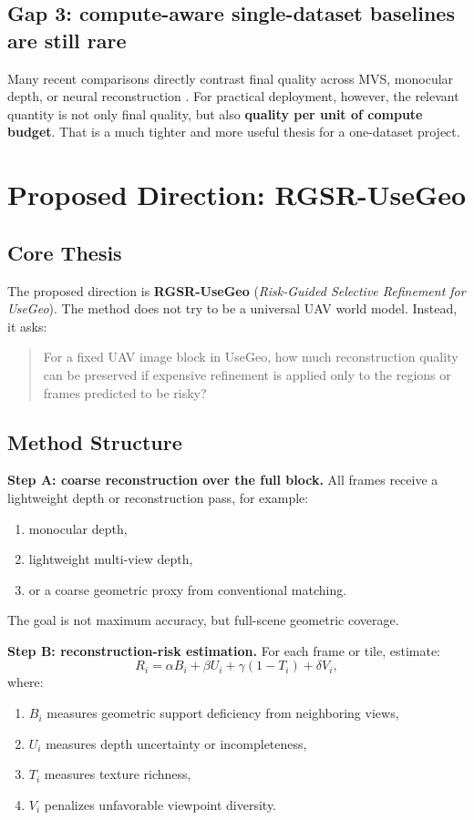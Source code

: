 \documentclass[11pt,a4paper]{article}
\begin{document}
\subsection{Gap 3: compute-aware single-dataset baselines are still rare}

Many recent comparisons directly contrast final quality across MVS, monocular depth, or neural reconstruction \citep{Wei2024LiDeNeRF,Wu2025AerialBlocks}. For practical deployment, however, the relevant quantity is not only final quality, but also \textbf{quality per unit of compute budget}. That is a much tighter and more useful thesis for a one-dataset project.

\section{Proposed Direction: RGSR-UseGeo}

\subsection{Core Thesis}

The proposed direction is \textbf{RGSR-UseGeo} (\textit{Risk-Guided Selective Refinement for UseGeo}). The method does not try to be a universal UAV world model. Instead, it asks:

\begin{quote}
For a fixed UAV image block in UseGeo, how much reconstruction quality can be preserved if expensive refinement is applied only to the regions or frames predicted to be risky?
\end{quote}

\subsection{Method Structure}

\textbf{Step A: coarse reconstruction over the full block.}
All frames receive a lightweight depth or reconstruction pass, for example:
\begin{enumerate}[leftmargin=1.5em]
  \item monocular depth,
  \item lightweight multi-view depth,
  \item or a coarse geometric proxy from conventional matching.
\end{enumerate}
The goal is not maximum accuracy, but full-scene geometric coverage.

\textbf{Step B: reconstruction-risk estimation.}
For each frame or tile, estimate:
\[
R_i = \alpha B_i + \beta U_i + \gamma (1-T_i) + \delta V_i,
\]
where:
\begin{enumerate}[leftmargin=1.5em]
  \item $B_i$ measures geometric support deficiency from neighboring views,
  \item $U_i$ measures depth uncertainty or incompleteness,
  \item $T_i$ measures texture richness,
  \item $V_i$ penalizes unfavorable viewpoint diversity.
\end{enumerate}
\end{document}
